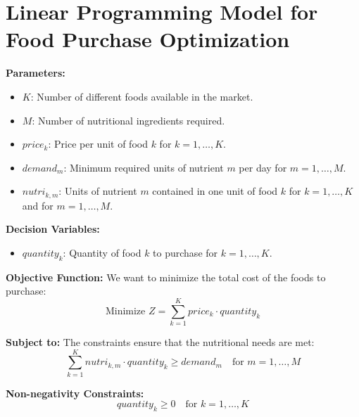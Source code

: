 \documentclass{article}
\begin{document}
\section*{Linear Programming Model for Food Purchase Optimization}

\textbf{Parameters:}
\begin{itemize}
    \item $K$: Number of different foods available in the market.
    \item $M$: Number of nutritional ingredients required.
    \item $price_k$: Price per unit of food $k$ for $k = 1, \ldots, K$.
    \item $demand_m$: Minimum required units of nutrient $m$ per day for $m = 1, \ldots, M$.
    \item $nutri_{k,m}$: Units of nutrient $m$ contained in one unit of food $k$ for $k = 1, \ldots, K$ and for $m = 1, \ldots, M$.
\end{itemize}

\textbf{Decision Variables:}
\begin{itemize}
    \item $quantity_k$: Quantity of food $k$ to purchase for $k = 1, \ldots, K$.
\end{itemize}

\textbf{Objective Function:}
We want to minimize the total cost of the foods to purchase:
\[
\text{Minimize } Z = \sum_{k=1}^{K} price_k \cdot quantity_k
\]

\textbf{Subject to:}
The constraints ensure that the nutritional needs are met:
\[
\sum_{k=1}^{K} nutri_{k,m} \cdot quantity_k \geq demand_m \quad \text{for } m = 1, \ldots, M
\]

\textbf{Non-negativity Constraints:}
\[
quantity_k \geq 0 \quad \text{for } k = 1, \ldots, K
\]
\end{document}
